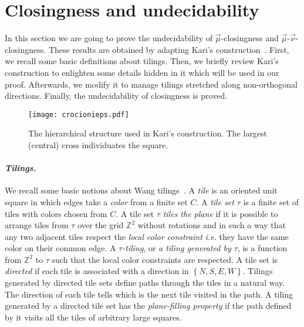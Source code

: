 \documentclass{llncs}
\makeatletter
\newcommand{\z}{\ensuremath{\mathbb{Z}}\xspace}
\newcommand{\ie}{\emph{i.e.}\@\xspace}
\newcommand{\set}[1]{\left\{#1\right\}}
\newcommand{\nn}{\vec\nu}
\newcommand{\mm}{\vec \mu}
\newcommand{\ignore}[1]{}
\makeatother
\begin{document}
\section{Closingness and undecidability}\label{sec:closund}


In this section we are going to prove the undecidability of $\mm$-closingness and $\mm$-$\nn$-closingness. These
results are obtained by adapting Kari's construction~\cite{kari94a}. First, we recall some basic definitions about tilings. Then, 
we briefly review Kari's construction to enlighten some details hidden in it which will be used in our proof. Afterwards, we modify it
to manage tilings stretched along non-orthogonal directions. Finally, the undecidability of closingness is proved.



\begin{figure}[t]
\begin{center}
\texttt{[image: crocionieps.pdf]}
\caption{The hierarchical structure used in Kari's construction. The largest (central) cross individuates the square.}
\label{fig:crocioni}
\end{center}
\end{figure}

\ignore{
\begin{figure}[t]
\begin{center}
\texttt{[image: peano.pdf]}
\caption{Example of plane-filling path.}
\label{ROB2}
\end{center}
\end{figure}
}


\paragraph{\emph{Tilings.}} We recall some basic notions about Wang 
tilings~\cite{wang62}.  A \emph{tile} is an oriented unit
square in which edges take a \emph{color} from a finite set $C$.  
A \emph{tile set} $\tau$ is a finite set of tiles with colors chosen from 
$C$. A tile set $\tau$ 
\emph{tiles the plane} if it is possible to arrange tiles from  $\tau$ over the grid $\z^2$ without rotations and in such a way that any two adjacent tiles respect the \emph{local color constraint} \ie they have 
the same color on  their common edge. A \emph{$\tau$-tiling}, or 
\emph{a tiling generated by $\tau$},  is a function from $\z^2$ to 
$\tau$ such that the local color constraints are respected.
A tile set is \emph{directed} if each tile is associated with a direction
in $\set{N,S,E,W}$. Tilings generated by directed tile sets define 
paths through the tiles in a natural way. The direction of
each tile tells which is the next tile visited in the path. A tiling generated by a directed tile set has the 
\emph{plane-filling property} if the path defined by it visits all the
tiles of arbitrary large squares.
\end{document}
